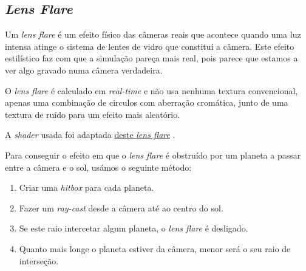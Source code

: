 \subsection{\textit{Lens Flare}}

Um \textit{lens flare} é um efeito físico das câmeras reais que acontece quando uma luz intensa atinge o sistema de lentes de vidro que constituí a câmera. Este efeito estilístico faz com que a simulação pareça mais real, pois parece que estamos a ver algo gravado numa câmera verdadeira.

\noindent
O \textit{lens flare} é calculado em \textit{real-time} e não usa nenhuma textura convencional, apenas uma combinação de circulos com aberração cromática, junto de uma textura de ruído para um efeito mais aleatório.  

\noindent
A \textit{shader} usada foi adaptada \hyperlink{https://www.shadertoy.com/view/4sX3Rs}{deste \textit{lens flare}} \cite{shadertoy}.

\noindent
Para conseguir o efeito em que o \textit{lens flare} é obstruído por um planeta a passar entre a câmera e o sol, usámos o seguinte método:
\begin{enumerate}
    \item Criar uma \textit{hitbox} para cada planeta.
    \item Fazer um \textit{ray-cast} desde a câmera até ao centro do sol.
    \item Se este raio intercetar algum planeta, o \textit{lens flare} é desligado.
    \item Quanto mais longe o planeta estiver da câmera, menor será o seu raio de interseção.
\end{enumerate}


